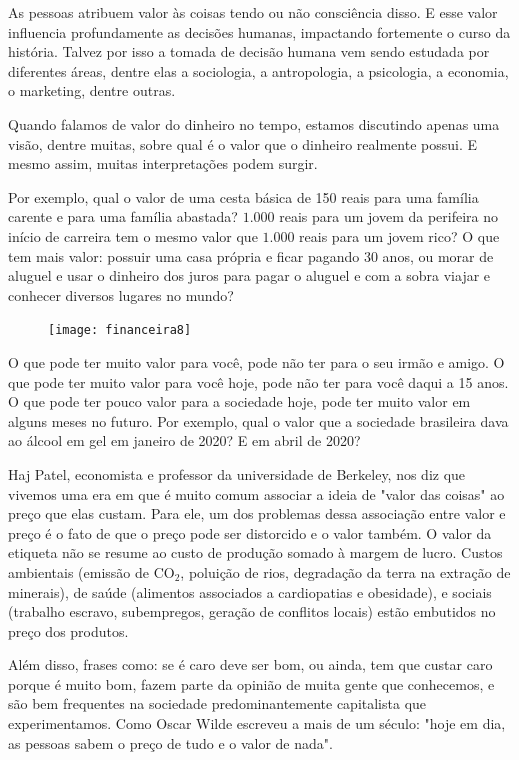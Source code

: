 \begin{reflection}
As pessoas atribuem valor às coisas tendo ou não consciência disso. E esse valor influencia profundamente as decisões humanas, impactando fortemente o curso da história. Talvez por isso a tomada de decisão humana vem sendo estudada por diferentes áreas, dentre elas a sociologia, a antropologia, a psicologia, a economia, o marketing, dentre outras.

Quando falamos de valor do dinheiro no tempo, estamos discutindo apenas uma visão, dentre muitas, sobre qual é o valor que o dinheiro realmente possui. E mesmo assim, muitas interpretações podem surgir.

Por exemplo, qual o valor de uma cesta básica de 150 reais para uma família carente e para uma família abastada? $1.000$ reais para um jovem da perifeira no início de carreira tem o mesmo valor que $1.000$ reais para um jovem rico? O que tem mais valor: possuir uma casa própria e ficar pagando 30 anos, ou morar de aluguel e usar o dinheiro dos juros para pagar o aluguel e com a sobra viajar e conhecer diversos lugares no mundo?

\begin{figure}
\vspace{-1.1em}
\texttt{[image: financeira8]}
\end{figure}
O que pode ter muito valor para você, pode não ter para o seu irmão e amigo. O que pode ter muito valor para você hoje, pode não ter para você daqui a 15 anos. O que pode ter pouco valor para a sociedade hoje, pode ter muito valor em alguns meses no futuro. Por exemplo, qual o valor que a sociedade brasileira dava ao álcool em gel em janeiro de 2020? E em abril de 2020?

Haj Patel, economista e professor da universidade de Berkeley, nos diz que vivemos uma era em que é muito comum associar a ideia de "valor das coisas"{} ao preço que elas custam. Para ele, um dos problemas dessa associação entre valor e preço é o fato de que o preço pode ser distorcido e o valor também. O valor da etiqueta não se resume ao custo de produção somado à margem de lucro. Custos ambientais (emissão de CO$_{\text{2}}$, poluição de rios, degradação da terra na extração de minerais), de saúde (alimentos associados a cardiopatias e obesidade), e sociais (trabalho escravo, subempregos, geração de conflitos locais) estão embutidos no preço dos produtos.

Além disso, frases como: se é caro deve ser bom, ou ainda, tem que custar caro porque é muito bom, fazem parte da opinião de muita gente que conhecemos, e são bem frequentes na sociedade predominantemente capitalista que experimentamos. Como Oscar Wilde escreveu a mais de um século: "hoje em dia, as pessoas sabem o preço de tudo e o valor de nada".


\end{reflection}
